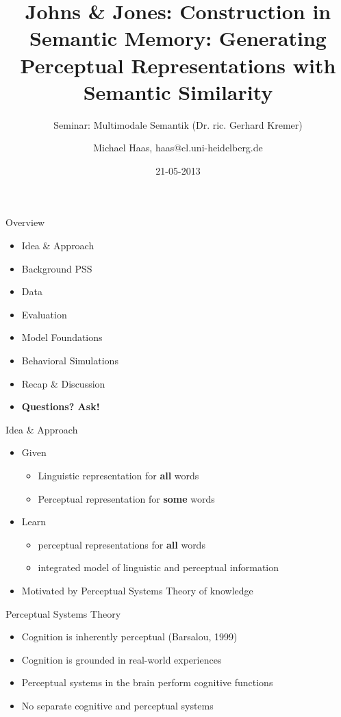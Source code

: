 \documentclass[12pt,a4paper]{beamer}
\author{Michael Haas, haas@cl.uni-heidelberg.de}
\title{Johns \& Jones: Construction in Semantic Memory: Generating Perceptual Representations with Semantic Similarity}
\subtitle{Seminar: Multimodale Semantik (Dr. ric. Gerhard Kremer)}
\date{21-05-2013}
\begin{document}
\begin{frame}
\maketitle
\end{frame}

\begin{frame}{Overview}
\begin{itemize}
\item Idea \& Approach %
\item Background PSS
\item Data
\item Evaluation
    \item Model Foundations
    \item Behavioral Simulations
\item Recap \& Discussion
\item \textbf{Questions? Ask!}
\end{itemize}
\end{frame}


\begin{frame}{Idea \& Approach}
\begin{itemize}
\item Given
    \begin{itemize}
    \item Linguistic representation for \textbf{all} words
    \item Perceptual representation for \textbf{some} words
    \end{itemize}
\item Learn
    \begin{itemize}
    \item perceptual representations for \textbf{all} words
    \item integrated model of linguistic and perceptual information
    \end{itemize}
\item Motivated by Perceptual Systems Theory of knowledge
\end{itemize}
\end{frame}

\begin{frame}{Perceptual Systems Theory}
\begin{itemize}
\item Cognition is inherently perceptual (Barsalou, 1999) \cite{barsalou}
\item Cognition is grounded in real-world experiences
\item Perceptual systems in the brain perform cognitive functions
\item No separate cognitive and perceptual systems
\end{itemize}
\end{frame}
\end{document}
